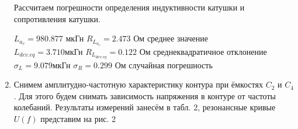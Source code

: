 \documentclass[a4paper]{article}
\begin{document}
\begin{enumerate}
\begin{table}[h]
\begin{tabular}{ |p{1.2cm}|p{1.2cm}|p{0.9cm}|p{0.9cm}|p{1.3cm}|p{1.2cm}|p{1.5cm}|p{1.2cm}|p{1.2cm}|p{1.3cm}|p{1.2cm}| }
    \end{tabular}
\end{table}

Рассчитаем погрешности определения индуктивности катушки и сопротивления катушки.

\begin{center}
    $L_a_v = 980.877$ мкГн \hspace{1cm} $R_L_a_v = 2.473$ Ом \hspace{1cm} среднее значение\\
    $L_{dev.eq} = 3.710 $мкГн \hspace{1cm} $R_L_{dev.eq} = 0.122$ Ом\hspace{1cm} среднеквадратичное отклонение\\
    $\sigma_L = 9.079 $мкГн \hspace{1cm} $\sigma_R = 0.299$ Ом\hspace{1cm} случайная погрешность \\ 
\end{center}


    \item Снимем амплитудно-частотную характеристику контура при ёмкостях $C_2$ и $C_4$. Для этого будем снимать зависимость напряжения в контуре от частоты колебаний. Результаты измерений занесём в табл. 2, резонансные кривые $U(f)$ представим на рис. 2
    

\end{enumerate}
\end{document}
